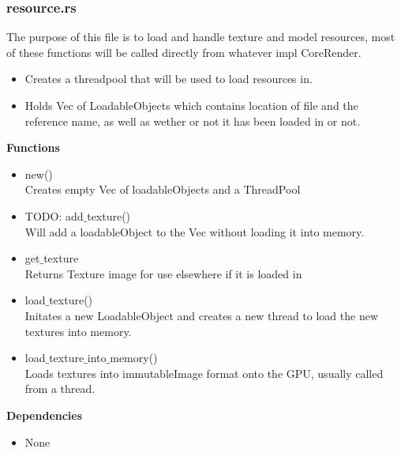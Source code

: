 \documentclass[12pt,a4paper]{article}
\begin{document}
\subsubsection{resource.rs}
The purpose of this file is to load and handle texture and model resources, most of these functions will be called directly from whatever impl CoreRender.\\
\begin{itemize}
\item Creates a threadpool that will be used to load resources in.
\item Holds Vec of LoadableObjects which contains location of file and the reference name, as well as wether or not it has been loaded in or not.
\end{itemize}
\textbf{Functions}
\begin{itemize}
\item new() \\Creates empty Vec of loadableObjects and a ThreadPool
\item TODO: add$\_$texture()\\Will add a loadableObject to the Vec without loading it into memory.
\item get$\_$texture\\Returns Texture image for use elsewhere if it is loaded in
\item load$\_$texture() \\Initates a new LoadableObject and creates a new thread to load the new textures into memory.
\item load$\_$texture$\_$into$\_$memory() \\Loads textures into immutableImage format onto the GPU, usually called from a thread.
\end{itemize}
\textbf{Dependencies}
\begin{itemize}
\item None
\end{itemize}
\end{document}
